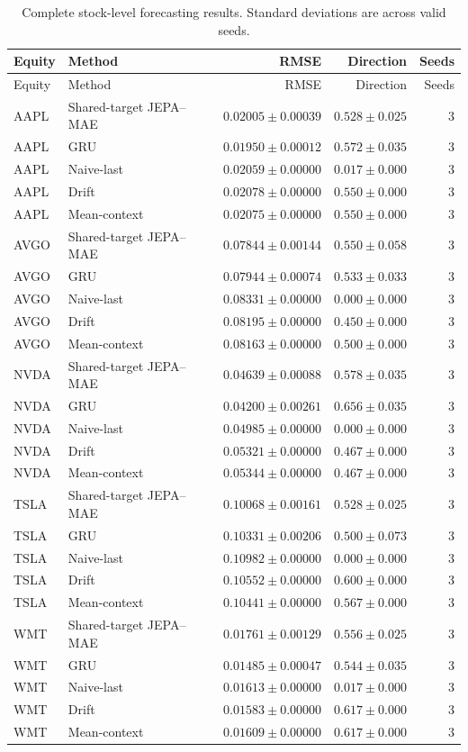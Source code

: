 \begin{longtable}{llrrr}
\caption{Complete stock-level forecasting results. Standard deviations are across valid seeds.}\label{tab:appendix_stock_metrics}\\
\toprule
Equity & Method & RMSE & Direction & Seeds \\
\midrule
\endfirsthead
\toprule
Equity & Method & RMSE & Direction & Seeds \\
\midrule
\endhead
AAPL & Shared-target JEPA--MAE & $0.02005 \pm 0.00039$ & $0.528 \pm 0.025$ & 3 \\
AAPL & GRU & $0.01950 \pm 0.00012$ & $0.572 \pm 0.035$ & 3 \\
AAPL & Naive-last & $0.02059 \pm 0.00000$ & $0.017 \pm 0.000$ & 3 \\
AAPL & Drift & $0.02078 \pm 0.00000$ & $0.550 \pm 0.000$ & 3 \\
AAPL & Mean-context & $0.02075 \pm 0.00000$ & $0.550 \pm 0.000$ & 3 \\
AVGO & Shared-target JEPA--MAE & $0.07844 \pm 0.00144$ & $0.550 \pm 0.058$ & 3 \\
AVGO & GRU & $0.07944 \pm 0.00074$ & $0.533 \pm 0.033$ & 3 \\
AVGO & Naive-last & $0.08331 \pm 0.00000$ & $0.000 \pm 0.000$ & 3 \\
AVGO & Drift & $0.08195 \pm 0.00000$ & $0.450 \pm 0.000$ & 3 \\
AVGO & Mean-context & $0.08163 \pm 0.00000$ & $0.500 \pm 0.000$ & 3 \\
NVDA & Shared-target JEPA--MAE & $0.04639 \pm 0.00088$ & $0.578 \pm 0.035$ & 3 \\
NVDA & GRU & $0.04200 \pm 0.00261$ & $0.656 \pm 0.035$ & 3 \\
NVDA & Naive-last & $0.04985 \pm 0.00000$ & $0.000 \pm 0.000$ & 3 \\
NVDA & Drift & $0.05321 \pm 0.00000$ & $0.467 \pm 0.000$ & 3 \\
NVDA & Mean-context & $0.05344 \pm 0.00000$ & $0.467 \pm 0.000$ & 3 \\
TSLA & Shared-target JEPA--MAE & $0.10068 \pm 0.00161$ & $0.528 \pm 0.025$ & 3 \\
TSLA & GRU & $0.10331 \pm 0.00206$ & $0.500 \pm 0.073$ & 3 \\
TSLA & Naive-last & $0.10982 \pm 0.00000$ & $0.000 \pm 0.000$ & 3 \\
TSLA & Drift & $0.10552 \pm 0.00000$ & $0.600 \pm 0.000$ & 3 \\
TSLA & Mean-context & $0.10441 \pm 0.00000$ & $0.567 \pm 0.000$ & 3 \\
WMT & Shared-target JEPA--MAE & $0.01761 \pm 0.00129$ & $0.556 \pm 0.025$ & 3 \\
WMT & GRU & $0.01485 \pm 0.00047$ & $0.544 \pm 0.035$ & 3 \\
WMT & Naive-last & $0.01613 \pm 0.00000$ & $0.017 \pm 0.000$ & 3 \\
WMT & Drift & $0.01583 \pm 0.00000$ & $0.617 \pm 0.000$ & 3 \\
WMT & Mean-context & $0.01609 \pm 0.00000$ & $0.617 \pm 0.000$ & 3 \\
\bottomrule
\end{longtable}

